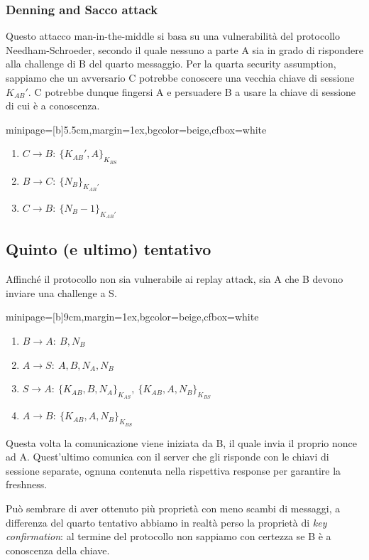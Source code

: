 \documentclass[a4paper, 11pt, twoside, openright, fleqn]{report}
\newcommand{\fromto}[2]{#1\rightarrow #2\!:\ }
\newenvironment{colbox}[2]%
{%
	\par\noindent\hspace{10pt}
	\begin{adjustbox}{minipage=[b]{#2},margin=1ex,bgcolor=#1,cfbox=white}
}{%
	\end{adjustbox}\newline%
}
\begin{document}
\subsubsection{Denning and Sacco attack}
Questo attacco man-in-the-middle si basa su una vulnerabilità del protocollo Needham-Schroeder, secondo il quale nessuno a parte A sia in grado di rispondere alla challenge di B del quarto messaggio. Per la quarta security assumption, sappiamo che un avversario C potrebbe conoscere una vecchia chiave di sessione $K_{AB}'$. C potrebbe dunque fingersi A e persuadere B a usare la chiave di sessione di cui è a conoscenza.
\begin{colbox}{beige}{5.5cm}
	\begin{enumerate}
		\item[3.] $\fromto{C}{B}\{K_{AB}',A\}_{K_{BS}}$
		\item[4.] $\fromto{B}{C}\{N_B\}_{K_{AB}'}$
		\item[5.] $\fromto{C}{B}\{N_B-1\}_{K_{AB}'}$
	\end{enumerate}
\end{colbox}

\subsection{Quinto (e ultimo) tentativo}
Affinché il protocollo non sia vulnerabile ai replay attack, sia A che B devono inviare una challenge a S.
\begin{colbox}{beige}{9cm}
	\begin{enumerate}
		\item $\fromto{B}{A}B,N_B$
		\item $\fromto{A}{S}A,B,N_A,N_B$
		\item $\fromto{S}{A}\{K_{AB},B,N_A\}_{K_{AS}},\ \{K_{AB},A,N_B\}_{K_{BS}}$
		\item $\fromto{A}{B}\{K_{AB},A,N_B\}_{K_{BS}}$
	\end{enumerate}
\end{colbox}
Questa volta la comunicazione viene iniziata da B, il quale invia il proprio nonce ad A. Quest'ultimo comunica con il server che gli risponde con le chiavi di sessione separate, ognuna contenuta nella rispettiva response per garantire la freshness.

Può sembrare di aver ottenuto più proprietà con meno scambi di messaggi, a differenza del quarto tentativo abbiamo in realtà perso la proprietà di \emph{key confirmation}: al termine del protocollo non sappiamo con certezza se B è a conoscenza della chiave.
\end{document}
